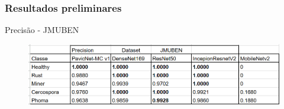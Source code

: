 \documentclass[aspectratio=169]{beamer}
\begin{document}





\begin{frame}
    \frametitle{Resultados preliminares}

    \centering
    Precisão - JMUBEN

    \begin{figure}
        \centering
        \includegraphics[scale = 0.7]{img/jmubenPrecs.png}
        \label{fig:enter-label}
    \end{figure}



\end{frame}








\end{document}
